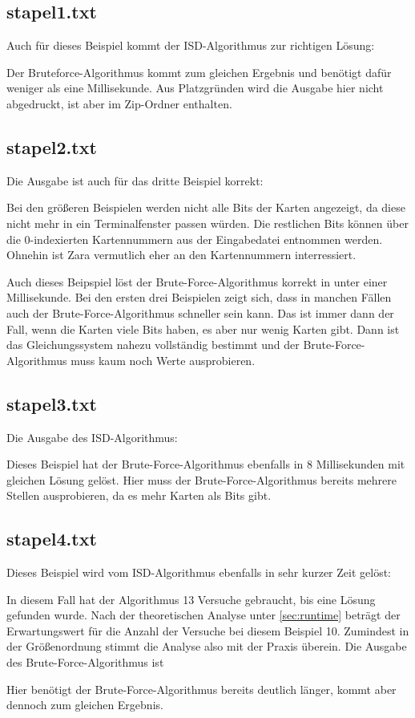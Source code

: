 \documentclass[a4paper,10pt,ngerman]{scrartcl}
\begin{document}
\subsection*{stapel1.txt}
Auch für dieses Beispiel kommt der ISD-Algorithmus zur richtigen Lösung:

Der Bruteforce-Algorithmus kommt zum gleichen Ergebnis und benötigt dafür weniger als eine Millisekunde. Aus Platzgründen wird die Ausgabe hier nicht abgedruckt, ist aber im Zip-Ordner enthalten.
\subsection*{stapel2.txt}
Die Ausgabe ist auch für das dritte Beispiel korrekt:

Bei den größeren Beispielen werden nicht alle Bits der Karten angezeigt, da diese nicht mehr in ein Terminalfenster passen würden. Die restlichen Bits können über die 0-indexierten Kartennummern aus der Eingabedatei entnommen werden. Ohnehin ist Zara vermutlich eher an den Kartennummern interressiert. 

Auch dieses Beipspiel löst der Brute-Force-Algorithmus korrekt in unter einer Millisekunde. Bei den ersten drei Beispielen zeigt sich, dass in manchen Fällen auch der Brute-Force-Algorithmus schneller sein kann. Das ist immer dann der Fall, wenn die Karten viele Bits haben, es aber nur wenig Karten gibt. Dann ist das Gleichungssystem nahezu vollständig bestimmt und der Brute-Force-Algorithmus muss kaum noch Werte ausprobieren. 
\subsection*{stapel3.txt}
Die Ausgabe des ISD-Algorithmus:

Dieses Beispiel hat der Brute-Force-Algorithmus ebenfalls in 8 Millisekunden mit gleichen Lösung gelöst.
Hier muss der Brute-Force-Algorithmus bereits mehrere Stellen ausprobieren, da es mehr Karten als Bits gibt.
\subsection*{stapel4.txt}
Dieses Beispiel wird vom ISD-Algorithmus ebenfalls in sehr kurzer Zeit gelöst:

In diesem Fall hat der Algorithmus 13 Versuche gebraucht, bis eine Lösung gefunden wurde. Nach der theoretischen Analyse unter \ref{sec:runtime} beträgt der Erwartungswert für die Anzahl der Versuche bei diesem Beispiel 10. Zumindest in der Größenordnung stimmt die Analyse also mit der Praxis überein. 
Die Ausgabe des Brute-Force-Algorithmus ist

Hier benötigt der Brute-Force-Algorithmus bereits deutlich länger, kommt aber dennoch zum gleichen Ergebnis. 
\end{document}
